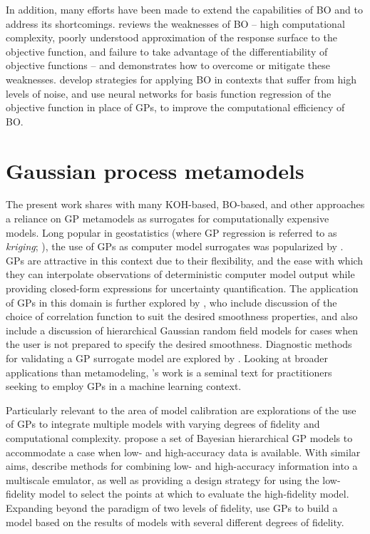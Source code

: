\documentclass[10pt,a4paper]{article}
\begin{document}
In addition, many efforts have been made to extend the capabilities of BO and to address its shortcomings.
\citet{Lizotte2008} reviews the weaknesses of BO -- high computational complexity, poorly understood approximation of the response surface to the objective function, and failure to take advantage of the differentiability of objective functions -- and demonstrates how to overcome or mitigate these weaknesses.
\citet{Letham2019} develop strategies for applying BO in contexts that suffer from high levels of noise, and \citet{Snoek2015} use neural networks for basis function regression of the objective function in place of GPs, to improve the computational efficiency of BO.

\section{Gaussian process metamodels}

The present work shares with many KOH-based, BO-based, and other approaches a reliance on GP metamodels as surrogates for computationally expensive models.
Long popular in geostatistics (where GP regression is referred to as \textit{kriging}; \cite{Cressie2015}), the use of GPs as computer model surrogates was popularized by \citet{Sacks1989}.
GPs are attractive in this context due to their flexibility, and the ease with which they can interpolate observations of deterministic computer model output while providing closed-form expressions for uncertainty quantification.
The application of GPs in this domain is further explored by \citet{Santner2003a}, who include discussion of the choice of correlation function to suit the desired smoothness properties, and also include a discussion of hierarchical Gaussian random field models for cases when the user is not prepared to specify the desired smoothness.
Diagnostic methods for validating a GP surrogate model are explored by \citet{Bastos2009}.
Looking at broader applications than metamodeling, \citeauthor{Rasmussen2006}'s \citeyearpar{Rasmussen2006} work is a seminal text for practitioners seeking to employ GPs in a machine learning context.

Particularly relevant to the area of model calibration are explorations of the use of GPs to integrate multiple models with varying degrees of fidelity and computational complexity.
\citet{Qian2008a} propose a set of Bayesian hierarchical GP models to accommodate a case when low- and high-accuracy data is available.
With similar aims, \citet{Cumming2009} describe methods for combining low- and high-accuracy information into a multiscale emulator, as well as providing a design strategy for using the low-fidelity model to select the points at which to evaluate the high-fidelity model.
Expanding beyond the paradigm of two levels of fidelity, \citet{Goh2013} use GPs to build a model based on the results of models with several different degrees of fidelity.
\end{document}
